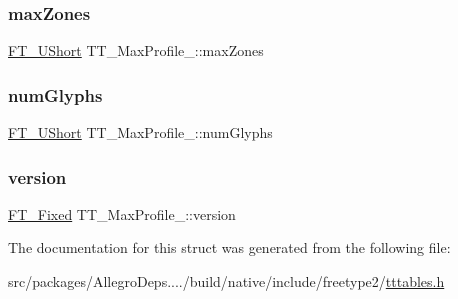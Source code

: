 \mbox{\label{struct_t_t___max_profile___a07213312ec7b821a53a17d90930a478a}} 
\subsubsection{\texorpdfstring{max\+Zones}{maxZones}}
{\footnotesize\ttfamily \hyperlink{fttypes_8h_a937f6c17cf5ffd09086d8610c37b9f58}{F\+T\+\_\+\+U\+Short} T\+T\+\_\+\+Max\+Profile\+\_\+\+::max\+Zones}

\mbox{\label{struct_t_t___max_profile___a6ec14b34978f24173d50ab556613ade5}} 
\subsubsection{\texorpdfstring{num\+Glyphs}{numGlyphs}}
{\footnotesize\ttfamily \hyperlink{fttypes_8h_a937f6c17cf5ffd09086d8610c37b9f58}{F\+T\+\_\+\+U\+Short} T\+T\+\_\+\+Max\+Profile\+\_\+\+::num\+Glyphs}

\mbox{\label{struct_t_t___max_profile___a59618f7c572dadc58e883d32dea46380}} 
\subsubsection{\texorpdfstring{version}{version}}
{\footnotesize\ttfamily \hyperlink{fttypes_8h_a5f5a679cc09f758efdd0d1c5feed3c3d}{F\+T\+\_\+\+Fixed} T\+T\+\_\+\+Max\+Profile\+\_\+\+::version}



The documentation for this struct was generated from the following file\+:\begin{DoxyCompactItemize}
\item 
src/packages/\+Allegro\+Deps..../build/native/include/freetype2/\hyperlink{tttables_8h}{tttables.\+h}\end{DoxyCompactItemize}
